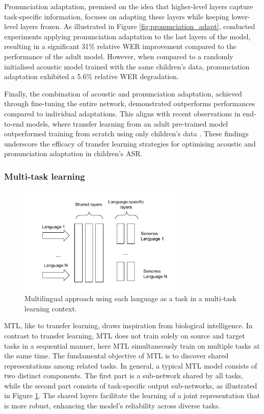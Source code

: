 Pronunciation adaptation, premised on the idea that higher-level layers capture task-specific information, focuses on adapting these layers while keeping lower-level layers frozen. As illustrated in Figure \ref{fig:pronunciation_adapt}, \cite{TFchildren} conducted experiments applying pronunciation adaptation to the last layers of the model, resulting in a significant 31\% relative \ac{WER} improvement compared to the performance of the adult model. However, when compared to a randomly initialised acoustic model trained with the same children's data, pronunciation adaptation exhibited a 5.6\% relative \ac{WER} degradation.

Finally, the combination of acoustic and pronunciation adaptation, achieved through fine-tuning the entire network, demonstrated outperforms performances compared to individual adaptations. This aligns with recent observations in end-to-end models, where transfer learning from an adult pre-trained model outperformed training from scratch using only children's data \cite{sri_end2end, gelin2021endtoend}. These findings underscore the efficacy of transfer learning strategies for optimising acoustic and pronunciation adaptation in children's \ac{ASR}. 

\subsubsection{Multi-task learning}%
\label{section:MTL}
\begin{figure}[t]
\begin{center}
\includegraphics[width=0.7\textwidth]{imgs/MTL.png}
\caption{Multilingual approach using each language as a task in a multi-task learning context.}
\label{fig:MTL}
\end{center}
\end{figure}

\ac{MTL}, like to transfer learning, draws inspiration from biological intelligence. In contrast to transfer learning, \ac{MTL} does not train solely on source and target tasks in a sequential manner, here \ac{MTL} simultaneously train on multiple tasks at the same time. The fundamental objective of \ac{MTL} is to discover shared representations among related tasks.  In general, a typical \ac{MTL} model consists of two distinct components. The first part is a sub-network shared by all tasks, while the second part consists of task-specific output sub-networks, as illustrated in Figure \ref{fig:MTL}. The shared layers facilitate the learning of a joint representation that is more robust, enhancing the model's reliability across diverse tasks.

